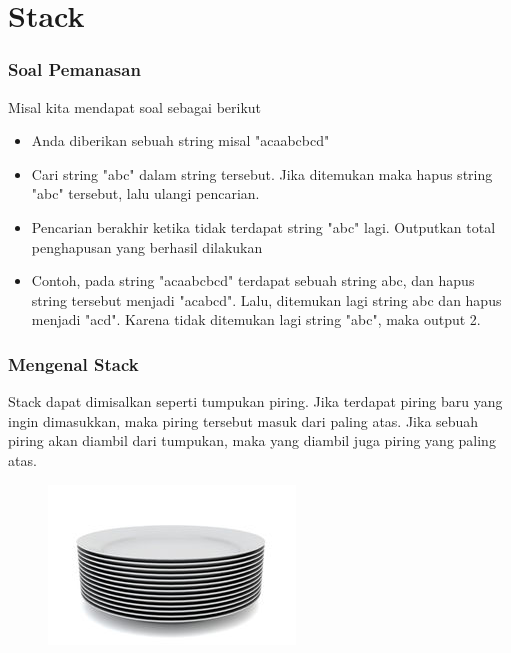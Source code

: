 \section{Stack}
\frame{\sectionpage}

\begin{frame}
\frametitle{Soal Pemanasan}

Misal kita mendapat soal sebagai berikut
\begin{itemize}
  \item Anda diberikan sebuah string misal "acaabcbcd"
  \item Cari string "abc" dalam string tersebut. Jika ditemukan maka hapus string "abc" tersebut, lalu ulangi pencarian.
  \item Pencarian berakhir ketika tidak terdapat string "abc" lagi. Outputkan total penghapusan yang berhasil dilakukan
  \item Contoh, pada string "acaabcbcd" terdapat sebuah string abc, dan hapus string tersebut menjadi "acabcd". Lalu, ditemukan lagi string abc dan hapus menjadi "acd". Karena tidak ditemukan lagi string "abc", maka output 2.
\end{itemize}
\end{frame}

\begin{frame}
\frametitle{Mengenal Stack}

Stack dapat dimisalkan seperti tumpukan piring. Jika terdapat piring baru yang ingin dimasukkan, maka piring tersebut masuk dari paling atas. Jika sebuah piring akan diambil dari tumpukan, maka yang diambil juga piring yang paling atas.

\begin{figure}
  \centering
  \includegraphics[width=4 cm]{asset/plates-stack.jpg}
\end{figure}

\end{frame}

